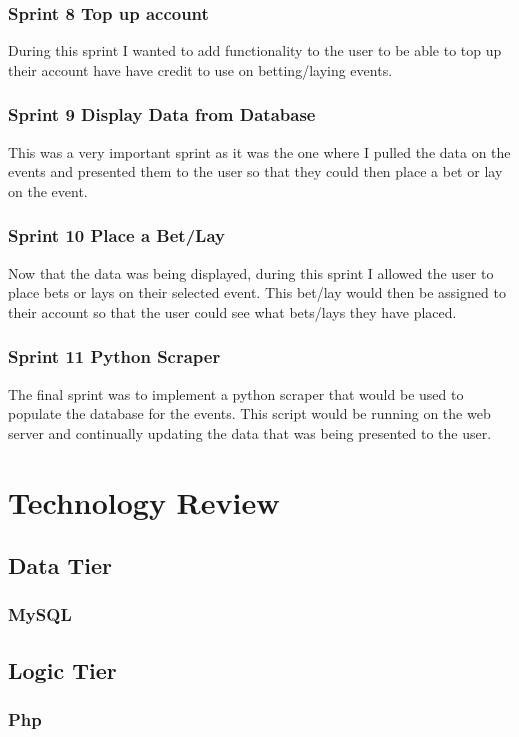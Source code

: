 \subsection{Sprint 8 Top up account}
During this sprint I wanted to add functionality to the user to be able to top up their account have have credit to use on betting/laying events.

\subsection{Sprint 9 Display Data from Database}
This was a very important sprint as it was the one where I pulled the data on the events and presented them to the user so that they could then place a bet or lay on the event.

\subsection{Sprint 10 Place a Bet/Lay}
Now that the data was being displayed, during this sprint I allowed the user to place bets or lays on their selected event. This bet/lay would then be assigned to their account so that the user could see what bets/lays they have placed.

\subsection{Sprint 11 Python Scraper}
The final sprint was to implement a python scraper that would be used to populate the database for the events. This script would be running on the web server and continually updating the data that was being presented to the user.

\chapter{Technology Review}

\section{Data Tier}
\subsection{MySQL}

\section{Logic Tier}
\subsection{Php}
